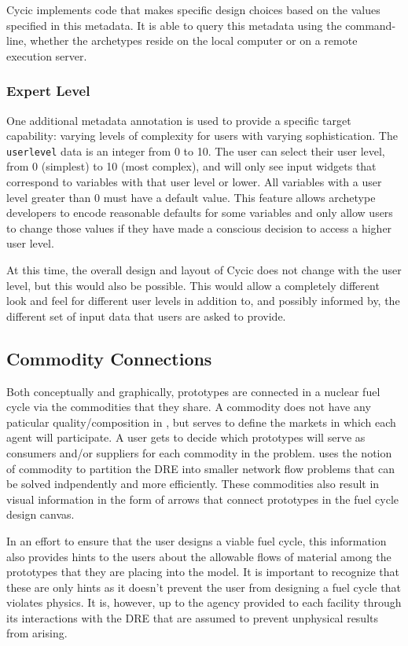Cycic implements code that makes specific design choices based on the values
specified in this metadata.  It is able to query this metadata using the
\Cyclus command-line, whether the archetypes reside on the local computer or
on a remote execution server.

\subsubsection{Expert Level}

One additional metadata annotation is used to provide a specific target
capability: varying levels of complexity for users with varying
sophistication.  The \texttt{userlevel} data is an integer from 0 to 10.  The
user can select their user level, from 0 (simplest) to 10 (most complex), and
will only see input widgets that correspond to variables with that user level
or lower.  All variables with a user level greater than 0 must have a default
value.  This feature allows archetype developers to encode reasonable defaults
for some variables and only allow users to change those values if they have
made a conscious decision to access a higher user level.

At this time, the overall design and layout of Cycic does not change with the
user level, but this would also be possible.  This would allow a completely
different look and feel for different user levels in addition to, and possibly
informed by, the different set of input data that users are asked to provide.

\subsection{Commodity Connections}

Both conceptually and graphically, prototypes are connected in a nuclear fuel
cycle via the commodities that they share.  A commodity does not have any
paticular quality/composition in \Cyclus, but serves to define the markets in
which each agent will participate.  A user gets to decide which prototypes
will serve as consumers and/or suppliers for each commodity in the problem.
\Cyclus uses the notion of commodity to partition the \gls{DRE} into smaller
network flow problems that can be solved indpendently and more efficiently.
These commodities also result in visual information in the form of arrows that
connect prototypes in the fuel cycle design canvas.

In an effort to ensure that the user designs a viable fuel cycle, this
information also provides hints to the users about the allowable flows of
material among the prototypes that they are placing into the model.  It is
important to recognize that these are only hints as it doesn't prevent the
user from designing a fuel cycle that violates physics.  It is, however, up to
the agency provided to each facility through its interactions with the
\gls{DRE} that are assumed to prevent unphysical results from arising.

